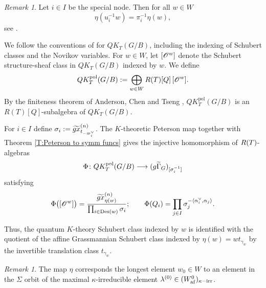 \documentclass[a4paper]{amsart}
\newcommand{\koushik}[1]{\todo[size=\tiny,color=green!30]{#1}}
\theoremstyle{remark}
\newtheorem{remark}[thm]{Remark}
\numberwithin{equation}{section}
\begin{document}
\begin{remark}
Let $i\in I$ be the special node. Then for all $w\in W$ \begin{equation}\eta(u_i^{-1}w)=\pi_i^{-1}\eta(w),\end{equation} see \cite[Lemma 3.3]{IKN}.
\end{remark}

We follow the conventions of \cite{MNS1} for $QK_T(G/B)$, including
the indexing of Schubert classes and the Novikov variables.
For $w\in W$, let $\cOO{w}$ denote the Schubert structure-sheaf class
in $QK_T(G/B)$ indexed by $w$. We define
\[
QK_T^{\mathrm{pol}}(G/B)
:=
\bigoplus_{w\in W} R(T)[Q]\,\cOO{w}.
\]
By the finiteness theorem of Anderson, Chen and Tseng \cite{ACT}, $QK_T^{\mathrm{pol}}(G/B)$ is an
$R(T)[Q]$-subalgebra of $QK_T(G/B)$.

For $i\in I$ define $\sigma_i:=\tgx{t_{-\varpi_i^\lor}}{n}$. The \(K\)-theoretic Peterson map \cite{Kato} together with Theorem \ref{T:Peterson to symm funcs} gives the injective homomorphism of $\RT$-algebras
\[
\Phi\colon
QK_T^{\mathrm{pol}}(G/B) 
\longrightarrow
(\gGtil_{G})_{[
\sigma_i^{-1}]}
\]
satisfying
\[
\Phi\bigl(\cOO{w}\bigr)
=
\frac{\tgx{\eta(w)}{n}}
     {\prod_{i\in \operatorname{Des}(w)} \sigma_i};\qquad \Phi(Q_i)=\prod_{j\in I}\sigma_j^{-\langle\alpha_i^\lor, \alpha_j\rangle}.
\]

Thus, the quantum \(K\)-theory Schubert class indexed by \(w\) is identified with the quotient of the affine Grassmannian Schubert class indexed by
\(\eta(w)=wt_{\gamma_w}\) by the invertible translation class
\(t_{\gamma_w}\).







\begin{remark}
     The map $\eta$ corresponds the longest element $w_0\in W$ to an element in the $\Sigma$ orbit of the maximal  $\kappa$-irreducible element  $\lambda^{(0)}\in (\Wafgr)_{\kappa-\text{irr}}$. 
\end{remark}
\end{document}
